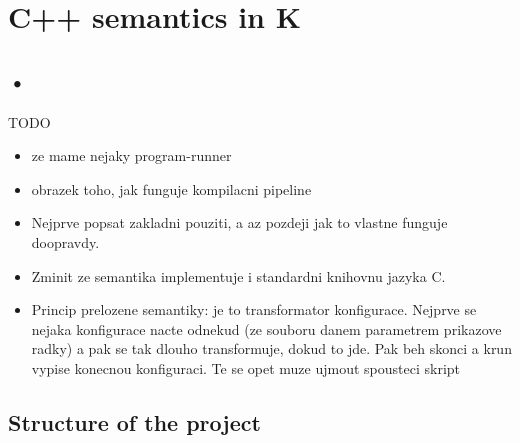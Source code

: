 \documentclass{fithesis3}
\begin{document}
\chapter{C++ semantics in K}




\section{•}

TODO
\begin{itemize}
\item ze mame nejaky program-runner
\item obrazek toho, jak funguje kompilacni pipeline
\item Nejprve popsat zakladni pouziti, a az pozdeji jak to vlastne funguje doopravdy.
\item Zminit ze semantika implementuje i standardni knihovnu jazyka C.
\item Princip prelozene semantiky: je to transformator konfigurace. Nejprve se nejaka konfigurace nacte odnekud (ze souboru danem parametrem prikazove radky) a pak se tak dlouho transformuje, dokud to jde. Pak beh skonci a krun vypise konecnou konfiguraci. Te se opet muze ujmout spousteci skript 
\end{itemize}

\section{Structure of the project}


\end{document}
